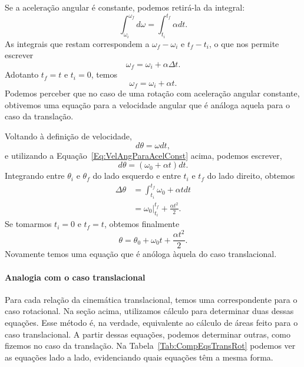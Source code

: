 Se a aceleração angular é constante, podemos retirá-la da integral:
\begin{equation}
		\int_{\omega_i}^{\omega_f} d\omega = \int_{t_i}^{t_f} \alpha dt.
\end{equation}
%
As integrais que restam correspondem a $\omega_f - \omega_i$ e $t_f - t_i$, o que nos permite escrever
\begin{equation}
	\omega_f = \omega_i + \alpha\Delta t.
\end{equation}
%
Adotanto $t_f = t$ e $t_i = 0$, temos 
\begin{equation}\label{Eq:VelAngParaAcelConst}
	\omega_f = \omega_i + \alpha t.
\end{equation}
%
Podemos perceber que no caso de uma rotação com aceleração angular constante, obtivemos uma equação para a velocidade angular que é análoga aquela para o caso da translação.

Voltando à definição de velocidade, 
\begin{equation}
	d\theta = \omega dt,
\end{equation}
%
e utilizando a Equação~\ref{Eq:VelAngParaAcelConst} acima, podemos escrever,
\begin{equation}
	d\theta = (\omega_0 + \alpha t) dt.
\end{equation}
%
Integrando entre $\theta_i$ e $\theta_f$ do lado esquerdo e entre $t_i$ e $t_f$ do lado direito, obtemos
\begin{align}
	\Delta \theta &= \int_{t_i}^{t_f} \omega_0 + \alpha t dt \\
	&= \omega_0 |_{t_i}^{t_f} + \frac{\alpha t^2}{2}.
\end{align}
%
Se tomarmos $t_i = 0$ e $t_f = t$, obtemos finalmente
\begin{equation}
	\theta = \theta_0 + \omega_0 t +\frac{\alpha t^2}{2}.
\end{equation}
%
Novamente temos uma equação que é anóloga àquela do caso translacional.
	
\paragraph{Analogia com o caso translacional}

Para cada relação da cinemática translacional, temos uma correspondente para o caso rotacional. Na seção acima, utilizamos cálculo para determinar duas dessas equações. Esse método é, na verdade, equivalente ao cálculo de áreas feito para o caso translacional. A partir dessas equações, podemos determinar outras, como fizemos no caso da translação. Na Tabela~\ref{Tab:CompEqsTransRot} podemos ver as equações lado a lado, evidenciando quais equações têm a mesma forma.

